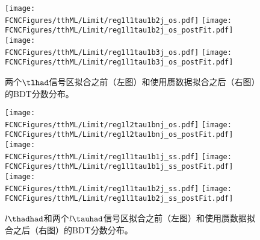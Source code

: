 \begin{figure}[H]
\centering
\texttt{[image: \\FCNCFigures/tthML/Limit/reg1l1tau1b2j\_os.pdf]}
\texttt{[image: \\FCNCFigures/tthML/Limit/reg1l1tau1b2j\_os\_postFit.pdf]}\\
\texttt{[image: \\FCNCFigures/tthML/Limit/reg1l1tau1b3j\_os.pdf]}
\texttt{[image: \\FCNCFigures/tthML/Limit/reg1l1tau1b3j\_os\_postFit.pdf]}\\

\caption{ 两个$\tlhad$信号区拟合之前（左图）和使用赝数据拟合之后（右图）的BDT分数分布。}
\label{fig:tthML_trexPrefit}
\end{figure}

\begin{figure}[H]
\centering
\texttt{[image: \\FCNCFigures/tthML/Limit/reg1l2tau1bnj\_os.pdf]}
\texttt{[image: \\FCNCFigures/tthML/Limit/reg1l2tau1bnj\_os\_postFit.pdf]}\\
\texttt{[image: \\FCNCFigures/tthML/Limit/reg1l1tau1b1j\_ss.pdf]}
\texttt{[image: \\FCNCFigures/tthML/Limit/reg1l1tau1b1j\_ss\_postFit.pdf]}\\
\texttt{[image: \\FCNCFigures/tthML/Limit/reg1l1tau1b2j\_ss.pdf]}
\texttt{[image: \\FCNCFigures/tthML/Limit/reg1l1tau1b2j\_ss\_postFit.pdf]}\\

\caption{ $l\thadhad$和两个$l\tauhad$信号区拟合之前（左图）和使用赝数据拟合之后（右图）的BDT分数分布。}
\label{fig:tthML_trexPrefit_1}
\end{figure}
